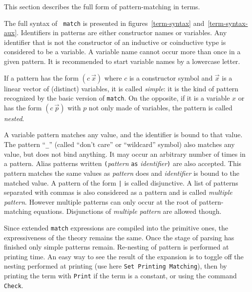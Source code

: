 {}

\label{Mult-match-full}

This section describes the full form of pattern-matching in {\Coq} terms.

\label{implementation} The full syntax of {\tt
match} is presented in figures~\ref{term-syntax}
and~\ref{term-syntax-aux}.  Identifiers in patterns are either
constructor names or variables. Any identifier that is not the
constructor of an inductive or coinductive type is considered to be a
variable. A variable name cannot occur more than once in a given
pattern. It is recommended to start variable names by a lowercase
letter.

If a pattern has the form $(c~\vec{x})$ where $c$ is a constructor
symbol and $\vec{x}$ is a linear vector of (distinct) variables, it is
called {\em simple}: it is the kind of pattern recognized by the basic
version of {\tt match}. On the opposite, if it is a variable $x$ or
has the form $(c~\vec{p})$ with $p$ not only made of variables, the
pattern is called {\em nested}.

A variable pattern matches any value, and the identifier is bound to
that value. The pattern ``\texttt{\_}'' (called ``don't care'' or
``wildcard'' symbol) also matches any value, but does not bind
anything. It may occur an arbitrary number of times in a
pattern. Alias patterns written \texttt{(}{\sl pattern} \texttt{as}
{\sl identifier}\texttt{)} are also accepted. This pattern matches the
same values as {\sl pattern} does and {\sl identifier} is bound to the
matched value.  
A pattern of the form {\pattern}{\tt |}{\pattern} is called
disjunctive. A list of patterns separated with commas is also
considered as a pattern and is called {\em multiple pattern}. However
multiple patterns can only occur at the root of pattern-matching
equations. Disjunctions of {\em multiple pattern} are allowed though.

Since extended {\tt match} expressions are compiled into the primitive
ones, the expressiveness of the theory remains the same. Once the
stage of parsing has finished only simple patterns remain.  Re-nesting
of pattern is performed at printing time. An easy way to see the
result of the expansion is to toggle off the nesting performed at
printing (use here {\tt Set Printing Matching}), then by printing the term
with \texttt{Print} if the term is a constant, or using the command
\texttt{Check}.

